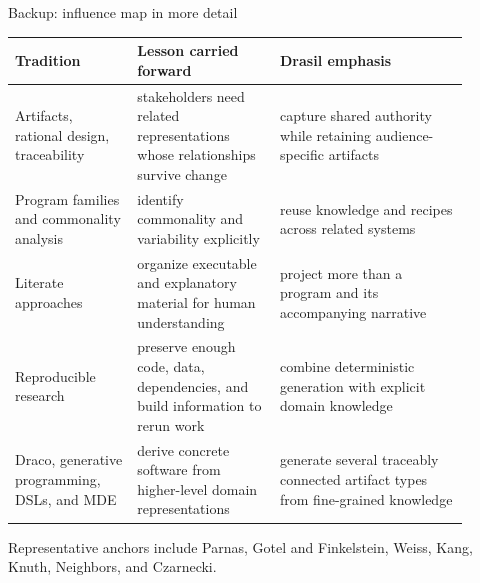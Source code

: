 \documentclass[aspectratio=169,10pt]{beamer}
\begin{document}
\begin{frame}{Backup: influence map in more detail}
\scriptsize
\renewcommand{\arraystretch}{1.18}
\begin{tabular}{>{\raggedright\arraybackslash}p{0.24\linewidth}
                >{\raggedright\arraybackslash}p{0.29\linewidth}
                >{\raggedright\arraybackslash}p{0.37\linewidth}}
\toprule
\textbf{Tradition} & \textbf{Lesson carried forward} & \textbf{Drasil emphasis}\\
\midrule
Artifacts, rational design, traceability & stakeholders need related representations whose relationships survive change & capture shared authority while retaining audience-specific artifacts\\[0.35em]
Program families and commonality analysis & identify commonality and variability explicitly & reuse knowledge and recipes across related systems\\[0.35em]
Literate approaches & organize executable and explanatory material for human understanding & project more than a program and its accompanying narrative\\[0.35em]
Reproducible research & preserve enough code, data, dependencies, and build information to rerun work & combine deterministic generation with explicit domain knowledge\\[0.35em]
Draco, generative programming, DSLs, and MDE & derive concrete software from higher-level domain representations & generate several traceably connected artifact types from fine-grained knowledge\\
\bottomrule
\end{tabular}
\vspace{0.3em}
\begin{center}
\footnotesize Representative anchors include Parnas, Gotel and Finkelstein, Weiss, Kang, Knuth, Neighbors, and Czarnecki.
\end{center}
\end{frame}
\end{document}
